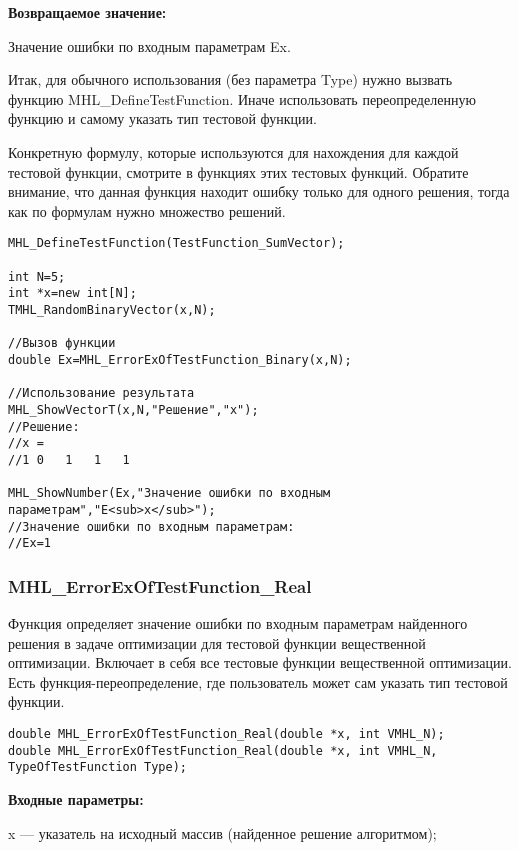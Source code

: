 \documentclass[a4paper,12pt]{article}
\begin{document}
\textbf{Возвращаемое значение:}
 
Значение ошибки по входным параметрам Ex.

Итак, для обычного использования (без параметра Type) нужно вызвать функцию MHL\_DefineTestFunction. Иначе использовать переопределенную функцию и самому указать тип тестовой функции.

Конкретную формулу, которые используются для нахождения для каждой тестовой функции, смотрите в функциях этих тестовых функций. Обратите внимание, что данная функция находит ошибку только для одного решения, тогда как по формулам нужно множество решений.


\begin{lstlisting}[label=code_use_MHL_ErrorExOfTestFunction_Binary,caption=Пример использования]
MHL_DefineTestFunction(TestFunction_SumVector);

int N=5;
int *x=new int[N];
TMHL_RandomBinaryVector(x,N);

//Вызов функции
double Ex=MHL_ErrorExOfTestFunction_Binary(x,N);

//Использование результата
MHL_ShowVectorT(x,N,"Решение","x");
//Решение:
//x =	
//1	0	1	1	1

MHL_ShowNumber(Ex,"Значение ошибки по входным параметрам","E<sub>x</sub>");
//Значение ошибки по входным параметрам:
//Ex=1
\end{lstlisting}

\subsubsection{MHL\_ErrorExOfTestFunction\_Real}\label{MHL_ErrorExOfTestFunction_Real}

Функция определяет значение ошибки по входным параметрам найденного решения в задаче оптимизации для тестовой функции вещественной оптимизации. Включает в себя все тестовые функции вещественной оптимизации. Есть функция-переопределение, где пользователь может сам указать тип тестовой функции.


\begin{lstlisting}[label=code_syntax_MHL_ErrorExOfTestFunction_Real,caption=Синтаксис]
double MHL_ErrorExOfTestFunction_Real(double *x, int VMHL_N);
double MHL_ErrorExOfTestFunction_Real(double *x, int VMHL_N, TypeOfTestFunction Type);
\end{lstlisting}

\textbf{Входные параметры:}

x --- указатель на исходный массив (найденное решение алгоритмом);
\end{document}
